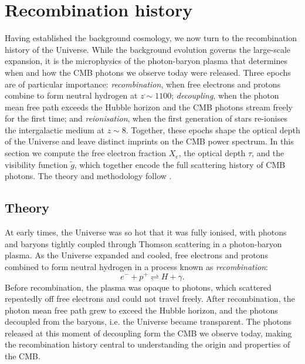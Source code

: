 \documentclass[twocolumn]{aa}
\begin{document}
\section{Recombination history}

Having established the background cosmology, we now turn to the recombination history of the Universe. While the background evolution governs the large-scale expansion, it is the microphysics of the photon-baryon plasma that determines when and how the CMB photons we observe today were released. Three epochs are of particular importance: \textit{recombination}, when free electrons and protons combine to form neutral hydrogen at $z \sim 1100$; \textit{decoupling}, when the photon mean free path exceeds the Hubble horizon and the CMB photons stream freely for the first time; and \textit{reionisation}, when the first generation of stars re-ionises the intergalactic medium at $z \sim 8$. Together, these epochs shape the optical depth of the Universe and leave distinct imprints on the CMB power spectrum. In this section we compute the free electron fraction $X_e$, the optical depth $\tau$, and the visibility function $\tilde{g}$, which together encode the full scattering history of CMB photons. The theory and methodology follow \citet{winther_lectures, winther_milestone2}.

\subsection{Theory}
At early times, the Universe was so hot that it was fully ionised, with photons and baryons tightly coupled through Thomson scattering in a photon-baryon plasma. As the Universe expanded and cooled, free electrons and protons combined to form neutral hydrogen in a process known as \textit{recombination}:
$$e^- + p^+ \rightleftharpoons H + \gamma.$$
Before recombination, the plasma was opaque to photons, which scattered repeatedly off free electrons and could not travel freely. After recombination, the photon mean free path grew to exceed the Hubble horizon, and the photons decoupled from the baryons, i.e. the Universe became transparent. The photons released at this moment of decoupling form the CMB we observe today, making the recombination history central to understanding the origin and properties of the CMB.
\end{document}
